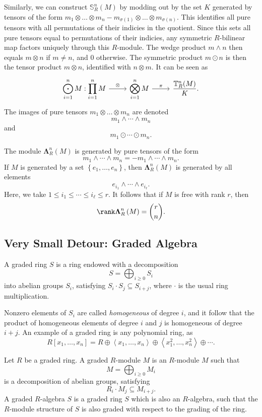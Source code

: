Similarly, we can construct $\mathbb{S} _R^n(M)$ by modding out by the set $K$ generated by tensors of the form $m_1 \otimes \ldots \otimes m_n-m_{\sigma (1)} \otimes \ldots \otimes m_{\sigma (n)} $. This identifies all pure tensors with all permutations of their indicies in the quotient. Since this sets all pure tensors equal to permutations of their indicies, any symmetric $R$-bilinear map factors uniquely through this $R$-module. The wedge product $m\wedge n$ then equals $m\otimes n$ if $m\neq n$, and $0$ otherwise. The symmetric product $m \odot n$ is then the tensor product $m\otimes n$, identified with $n\otimes m$. It can be seen as
\[\begin{tikzcd}[row sep = 2.5em, column sep = 2.5em]
	\displaystyle{\bigodot_{i=1}^n M: \prod_{i=1}^{n} M}\arrow[r, "\otimes "]&\displaystyle{\bigotimes_{i=1}^n M}\arrow[r, "\pi "]&\displaystyle{\frac{\mathbb{T} _R^n(M)}{K} }.
\end{tikzcd}\]
The images of pure tensors $m_1 \otimes \ldots \otimes m_n$ are denoted
\[
	m_1 \wedge \cdots \wedge m_n
\]
and
\[
	m_1 \odot \cdots \odot m_n
.\]

The module $\boldsymbol{\Lambda} _R^n(M)$ is generated by pure tensors of the form
\[
	m_1\wedge\cdots\wedge m_n=-m_1\wedge\cdots\wedge m_n
.\]
If $M$ is generated by a set $\left\{ e_1, \ldots, e_n  \right\} $, then $\boldsymbol{\Lambda} _R^n(M)$ is generated by all elements
\[
	e_{i_1} \wedge \cdots\wedge e_{i_\ell } 
.\]
Here, we take $1\leq i_1\leq \cdots\leq i_{\ell } \leq r$. It follows that if $M$ is free with rank $r$, then
\[
	\rank \boldsymbol{\Lambda} _R^n\left( M \right) =\binom{r}{n} 
.\]

\subsection{Very Small Detour: Graded Algebra}
\begin{definition}\label{dfn:8.16}
	A graded ring $S$ is a ring endowed with a decomposition
	\[
		S=\bigoplus_{i\geq 0}S_i
	\]
	into abelian groups $S_i$, satisfying $S_i\cdot S_j\subseteq S_{i+j} $, where $\cdot $ is the usual ring multiplication.
\end{definition}

Nonzero elements of $S_i$ are called \emph{homogeneous} of degree $i$, and it follow that the product of homogeneous elements of degree $i$ and $j$ is homogeneous of degree $i+j$. An example of a graded ring is any polynomial ring, as
\[
	R[x_1, \ldots, x_n ]=R\oplus \left\langle x_1, \ldots, x_n  \right\rangle \oplus \left\langle x^2_1, \ldots, x^2_n  \right\rangle \oplus \cdots 
.\]
\begin{definition}\label{dfn:8.17}
	Let $R$ be a graded ring. A graded $R$-module $M$ is an $R$-module $M$ such that
	\[
		M=\bigoplus_{i\geq 0}M_i
	\]
	is a decomposition of abelian groups, satisfying
	\[
		R_i\cdot M_j\subseteq M_{i+j} 
	.\]
	A graded $R$-algebra $S$ is a graded ring $S$ which is also an $R$-algebra, such that the $R$-module structure of $S$ is also graded with respect to the grading of the ring.
\end{definition}

